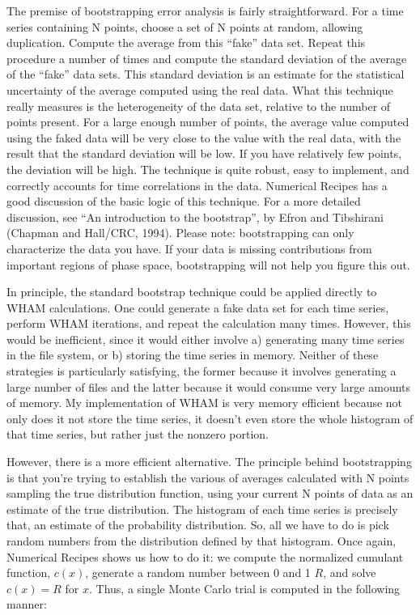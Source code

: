 \documentclass[12pt]{article}
\begin{document}
The premise of bootstrapping error analysis is fairly straightforward.  For
a time series containing N points, choose a set of N points at random,
allowing duplication.  Compute the average from this ``fake'' data set.
Repeat this procedure a number of times and compute the standard deviation
of the average of the ``fake'' data sets.  This standard deviation is an
estimate for the statistical uncertainty of the average computed using the
real data.  What this technique really measures is the heterogeneity of the
data set, relative to the number of points present.  For a large enough
number of points, the average value computed using the faked data will be
very close to the value with the real data, with the result that the
standard deviation will be low.  If you have relatively few points, the
deviation will be high.  The technique is quite robust, easy to implement,
and correctly accounts for time correlations in the data.  Numerical
Recipes has a good discussion of the basic logic of this technique.  For a
more detailed discussion, see ``An introduction to the bootstrap'', by Efron
and Tibshirani (Chapman and Hall/CRC, 1994).  Please note: bootstrapping can
only characterize the data you have.  If your data is missing contributions
from important regions of phase space, bootstrapping will not help you figure
this out.  

In principle, the standard bootstrap technique could be applied directly to
WHAM calculations.  One could generate a fake data set for each time
series, perform WHAM iterations, and repeat the calculation many times.
However, this would be inefficient, since it would either involve a)
generating many time series in the file system, or b) storing the time
series in memory.  Neither of these strategies is particularly satisfying,
the former because it involves generating a large number of files and the
latter because it would consume very large amounts of memory.  
My implementation of WHAM is very memory efficient because not only does it
not store the time series, it doesn't even store the whole histogram of
that time series, but rather just the nonzero portion.

However, there is a more efficient alternative.  The principle behind
bootstrapping is that you're trying to establish the various of averages
calculated with N points sampling the true distribution function, using
your current N points of data as an estimate of the true distribution.
The histogram of each time series is precisely that, an estimate of the
probability distribution.  So, all we have to do is pick random numbers
from the distribution defined by that histogram.  Once again, Numerical
Recipes shows us how to do it: we compute the normalized cumulant function,
$c(x)$, generate a random number between 0 and 1 $R$, and solve $c(x) = R$ 
for $x$.  Thus, a single Monte Carlo trial is computed in the following manner:
\end{document}
